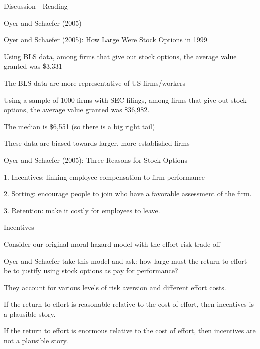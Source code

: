 \documentclass[aspectratio=169,usenames,dvipsnames]{beamer}
\newenvironment{wideitemize}{\itemize\addtolength{\itemsep}{10pt}}{\enditemize}
\begin{document}
\begin{frame}{Discussion - Reading}

\huge  Oyer and Schaefer (2005)
    
\end{frame}

\begin{frame}{Oyer and Schaefer (2005): How Large Were Stock Options in 1999}

\begin{wideitemize}
    \item Using BLS data, among firms that give out stock options, the average value granted  was \$3,331
    \begin{wideitemize}
        \item The BLS data are more representative of US firms/workers
    \end{wideitemize}
    \item Using a sample of 1000 firms with SEC filings, among firms that give out stock options, the average value granted was \$36,982.
    \begin{wideitemize}
        \item The median is \$6,551 (so there is a big right tail)
        \item These data are biased towards larger, more established firms
    \end{wideitemize}
\end{wideitemize}
    
\end{frame}
\begin{frame}{Oyer and Schaefer (2005): Three Reasons for Stock Options}
\begin{wideitemize}
    \item[1.] Incentives: linking employee compensation to firm performance
    \item[2.] Sorting: encourage people to join who have a favorable assessment of the firm.
    \item[3.] Retention: make it costly for employees to leave.
\end{wideitemize}
    
\end{frame}

\begin{frame}{Incentives}
    \begin{wideitemize}
        \item Consider our original moral hazard model with the effort-risk trade-off
        \item Oyer and Schaefer take this model and ask: how large must the return to effort be to justify using stock options as pay for performance?
        \item They account for various levels of risk aversion and different effort costs.
        \item If the return to effort is reasonable relative to the cost of effort, then incentives is a plausible story.
        \item If the return to effort is enormous relative to the cost of effort, then incentives are not a plausible story.
    \end{wideitemize}
\end{frame}
\end{document}
